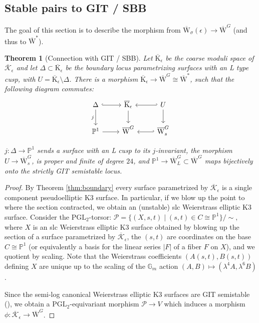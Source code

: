 \documentclass[11pt]{amsart}
\newtheorem{theorem}{Theorem}[section]
\theoremstyle{definition}
\newtheorem{remark}[theorem]{Remark}
\theoremstyle{remark}
\newcommand{\G}{{\mathbb G}}
\newcommand{\bP}{{\mathbb P}}
\newcommand{\calO}{\mathcal O}
\newcommand{\calP}{\mathcal P}
\newcommand{\mb}[1]{\mathbb{#1}}
\newcommand{\oMG}{\overline{\mathrm{W}}^G}
\newcommand{\oMGL}{\overline{\mathrm{W}}^G_L}
\newcommand{\sbb}{\overline{\mathrm{W}}^{*}}
\newcommand{\ke}{\overline{\mathcal{K}}_{\epsilon}}
\newcommand{\me}{\overline{\mathrm{K}}_\epsilon}
\newcommand{\fe}{\overline{\mathcal{F}}_\epsilon}
\newcommand{\kepsiloncoarse}{{\overline{\mathrm{W}}}_\sigma(\epsilon)}
\newcommand{\km}{\fe}
\begin{document}
	
	
	
	
	\subsection{Stable pairs to GIT / SBB}\label{sec:maptoGIT}
	The goal of this section is to describe the morphism from $\kepsiloncoarse \to \oMG$ (and thus to $\sbb$). 
	
	
	\begin{theorem}[Connection with GIT / SBB]\label{thm:git}
		Let $\me$ be the coarse moduli space of $\ke$ and let $\Delta \subset \me$ be the boundary locus parametrizing surfaces with an L type cusp, with $U = \me \setminus \Delta$. There is a morphism $\me \to \oMG \cong \sbb$, such that the following diagram commutes: $$
		\begin{tikzcd}
			\Delta \arrow[r,hook] \arrow{d}[swap]{j} & \me \arrow[d] & U \arrow[d] \arrow[l,hook'] \\ 
			\mb{P}^1 \arrow[r] & \oMG & \oMG_s \arrow[l,hook']
		\end{tikzcd}
		$$
		
		$j: \Delta \to \mb{P}^1$ sends a surface with an L cusp to its $j$-invariant, the morphism $U \to \oMG_s$, is proper and finite of degree $24$, and $\mb{P}^1 \to \oMGL \subset \oMG$  maps bijectively onto the strictly GIT semistable locus. \end{theorem}
	
	
	
	
	
	
	
	
	\begin{proof}
		By Theorem \ref{thm:boundary} every surface parametrized by $\ke$ is a single component pseudoelliptic K3 surface. In particular, if we blow up the point to where the section contracted, we obtain an (unstable) slc Weierstrass elliptic K3 surface.  Consider the $\mathrm{PGL}_2$-torsor:
		$\calP = \{(X, s, t) \mid (s,t) \in C \cong \bP^1 \}/\sim,$ where $X$ is an slc Weierstrass elliptic K3 surface obtained by blowing up the section of a surface parametrized by $\ke$, the $(s,t)$ are coordinates on the base $C \cong \bP^1$ (or equivalently a basis for the linear series $|F|$ of a fiber $F$ on $X$), and we quotient by scaling.  Note that the Weierstrass coefficients $(A(s,t),B(s,t))$ defining $X$ are unique up to the scaling of the $\G_m$ action $(A,B) \mapsto (\lambda^4A, \lambda^6B)$.
		
		Since the semi-log canonical Weierstrass elliptic K3 surfaces are GIT semistable (\cite[Proposition 5.1]{mir}), we obtain a $\mathrm{PGL}_2$-equivariant morphism $\calP \to V$ which induces a morphism $\phi: \ke \to \oMG$. \end{proof} 
	
\end{document}
